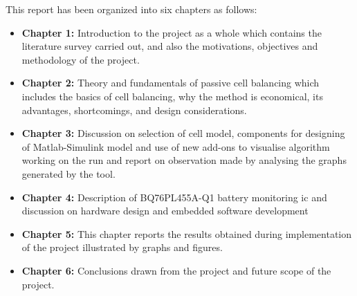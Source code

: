 This report has been organized into six chapters as follows:
\begin{itemize}
\item \textbf{Chapter 1:} Introduction to the project as a whole which contains the literature survey carried
out, and also the motivations, objectives and methodology of the project.
\item \textbf{Chapter 2:} Theory and fundamentals of passive cell balancing which includes the basics of cell balancing, why the method is economical, its advantages, shortcomings, and design considerations. 
\item \textbf{Chapter 3:} Discussion on selection of cell model, components for designing of Matlab-Simulink model and  use of new add-ons to visualise algorithm working on the run and report on observation made by analysing the graphs generated by the tool.
\item \textbf{Chapter 4:} Description of BQ76PL455A-Q1 battery monitoring \acrshort{ic} and discussion on hardware design and embedded software development 
\item \textbf{Chapter 5:} This chapter reports the results obtained during implementation of the project
illustrated by graphs and figures.
\item \textbf{Chapter 6:} Conclusions drawn from the project and future scope of the project.
\end{itemize}
